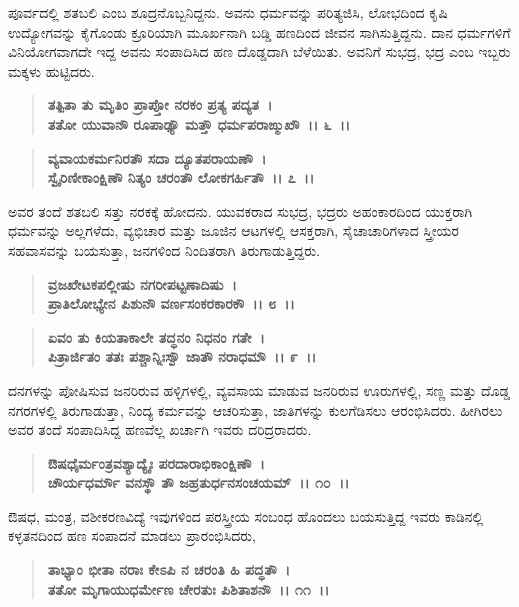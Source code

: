 ಪೂರ್ವದಲ್ಲಿ ಶತಬಲಿ ಎಂಬ ಶೂದ್ರನೊಬ್ಬನಿದ್ದನು. ಅವನು ಧರ್ಮವನ್ನು ಪರಿತ್ಯಜಿಸಿ, ಲೋಭದಿಂದ ಕೃಷಿ ಉದ್ಯೋಗವನ್ನು ಕೈಗೊಂಡು ಕ್ರೂರಿಯಾಗಿ ಮೂರ್ಖನಾಗಿ ಬಡ್ಡಿ ಹಣದಿಂದ ಜೀವನ ಸಾಗಿಸುತ್ತಿದ್ದನು. ದಾನ ಧರ್ಮಗಳಿಗೆ ವಿನಿಯೋಗವಾಗದೇ ಇದ್ದ ಅವನು ಸಂಪಾದಿಸಿದ ಹಣ ದೊಡ್ಡದಾಗಿ ಬೆಳೆಯಿತು. ಅವನಿಗೆ ಸುಭದ್ರ, ಭದ್ರ ಎಂಬ ಇಬ್ಬರು ಮಕ್ಕಳು ಹುಟ್ಟಿದರು.

\begin{verse}
\textbf{ತತ್ಪಿತಾ ತು ಮೃತಿಂ ಪ್ರಾಪ್ತೋ ನರಕಂ ಪ್ರತ್ಯ ಪದ್ಯತ~।}\\\textbf{ತತೋ ಯುವಾನೌ ರೂಪಾಢ್ಯೌ ಮತ್ತೌ ಧರ್ಮಪರಾಙ್ಮುಖೌ~।। ೬~।। }
\end{verse}

\begin{verse}
\textbf{ವ್ಯವಾಯಕರ್ಮನಿರತೌ ಸದಾ ದ್ಯೂತಪರಾಯಣೌ~।}\\\textbf{ಸ್ವೈರಿಣೀಕಾಂಕ್ಷಿಣೌ ನಿತ್ಯಂ ಚರಂತೌ ಲೋಕಗರ್ಹಿತೌ~।। ೭~।।}
\end{verse}

ಅವರ ತಂದೆ ಶತಬಲಿ ಸತ್ತು ನರಕಕ್ಕೆ ಹೋದನು. ಯುವಕರಾದ ಸುಭದ್ರ, ಭದ್ರರು ಅಹಂಕಾರದಿಂದ ಯುಕ್ತರಾಗಿ ಧರ್ಮವನ್ನು ಅಲ್ಲಗಳೆದು, ವ್ಯಭಿಚಾರ ಮತ್ತು ಜೂಜಿನ ಆಟಗಳಲ್ಲಿ ಆಸಕ್ತರಾಗಿ, ಸೈಚಾಚಾರಿಗಳಾದ ಸ್ತ್ರೀಯರ ಸಹವಾಸವನ್ನು ಬಯಸುತ್ತಾ, ಜನಗಳಿಂದ ನಿಂದಿತರಾಗಿ ತಿರುಗಾಡುತ್ತಿದ್ದರು.

\begin{verse}
\textbf{ವ್ರಜಖೇಟಕಪಲ್ಲೀಷು ನಗರೀಪಟ್ಟಣಾದಿಷು~।}\\\textbf{ಪ್ರಾತಿಲೋಭ್ಯೇನ ಪಿಶುನೌ ವರ್ಣಸಂಕರಕಾರಕೌ~।। ೮~।। }
\end{verse}

\begin{verse}
\textbf{ಏವಂ ತು ಕಿಯತಾಕಾಲೇ ತದ್ಧನಂ ನಿಧನಂ ಗತೇ~।}\\\textbf{ಪಿತ್ರಾರ್ಜಿತಂ ತತಃ ಪಶ್ಚಾನ್ನಿಃಸ್ವೌ ಜಾತೌ ನರಾಧಮೌ~।। ೯~।।}
\end{verse}

ದನಗಳನ್ನು ಪೋಷಿಸುವ ಜನರಿರುವ ಹಳ್ಳಿಗಳಲ್ಲಿ, ವ್ಯವಸಾಯ ಮಾಡುವ ಜನರಿರುವ ಊರುಗಳಲ್ಲಿ, ಸಣ್ಣ ಮತ್ತು ದೊಡ್ಡ ನಗರಗಳಲ್ಲಿ ತಿರುಗಾಡುತ್ತಾ, ನಿಂದ್ಯ ಕರ್ಮವನ್ನು ಆಚರಿಸುತ್ತಾ, ಜಾತಿಗಳನ್ನು ಕುಲಗೆಡಿಸಲು ಆರಂಭಿಸಿದರು. ಹೀಗಿರಲು ಅವರ ತಂದೆ ಸಂಪಾದಿಸಿದ್ದ ಹಣವೆಲ್ಲ ಖರ್ಚಾಗಿ ಇವರು ದರಿದ್ರರಾದರು.

\begin{verse}
\textbf{ಔಷಧೈರ್ಮಂತ್ರವಶ್ಯಾದ್ಯೈಃ ಪರದಾರಾಭಿಕಾಂಕ್ಷಿಣೌ~।}\\\textbf{ಚೌರ್ಯಧರ್ಮೌ ವನಸ್ಥೌ ತೌ ಜಹ್ರತುರ್ಧನಸಂಚಯಮ್~।। ೧೦~।।}
\end{verse}

ಔಷಧ, ಮಂತ್ರ, ವಶೀಕರಣವಿದ್ಯೆ ಇವುಗಳಿಂದ ಪರಸ್ತ್ರೀಯ ಸಂಬಂಧ ಹೊಂದಲು ಬಯಸುತ್ತಿದ್ದ ಇವರು ಕಾಡಿನಲ್ಲಿ ಕಳ್ಳತನದಿಂದ ಹಣ ಸಂಪಾದನೆ ಮಾಡಲು ಪ್ರಾರಂಭಿಸಿದರು,

\begin{verse}
\textbf{ತಾಭ್ಯಾಂ ಭೀತಾ ನರಾಃ ಕೇಽಪಿ ನ ಚರಂತಿ ಹಿ ಪದ್ಧತೌ~।}\\\textbf{ತತೋ ಮೃಗಾಯುಧರ್ಮೇಣ ಚೇರತುಃ ಪಿಶಿತಾಶನೌ~।। ೧೧~।।}
\end{verse}

